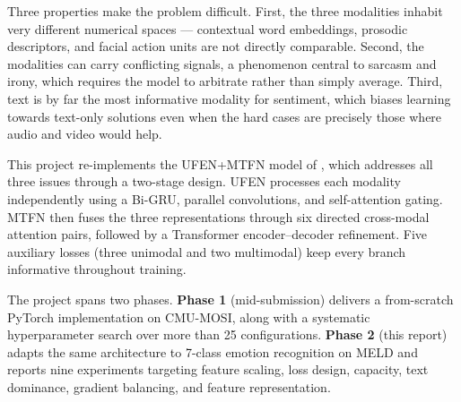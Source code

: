 \documentclass[11pt,twocolumn]{article}
\begin{document}
Three properties make the problem difficult. First, the three modalities inhabit very different numerical spaces --- contextual word embeddings, prosodic descriptors, and facial action units are not directly comparable. Second, the modalities can carry conflicting signals, a phenomenon central to sarcasm and irony, which requires the model to arbitrate rather than simply average. Third, text is by far the most informative modality for sentiment, which biases learning towards text-only solutions even when the hard cases are precisely those where audio and video would help.

This project re-implements the UFEN+MTFN model of \citet{cai2025multimodal}, which addresses all three issues through a two-stage design. UFEN processes each modality independently using a Bi-GRU, parallel convolutions, and self-attention gating. MTFN then fuses the three representations through six directed cross-modal attention pairs, followed by a Transformer encoder--decoder refinement. Five auxiliary losses (three unimodal and two multimodal) keep every branch informative throughout training.

The project spans two phases. \textbf{Phase 1} (mid-submission) delivers a from-scratch PyTorch implementation on CMU-MOSI, along with a systematic hyperparameter search over more than 25 configurations. \textbf{Phase 2} (this report) adapts the same architecture to 7-class emotion recognition on MELD and reports nine experiments targeting feature scaling, loss design, capacity, text dominance, gradient balancing, and feature representation.

\end{document}

